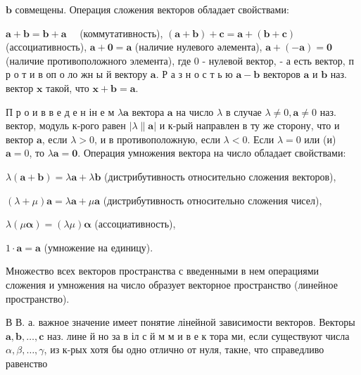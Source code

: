 \documentclass[10pt]{article}
\begin{document}
$\boldsymbol{b}$ совмещены. Операция сложения векторов обладает свойствами:



$\boldsymbol{a}+\boldsymbol{b}=\boldsymbol{b}+\boldsymbol{a} \quad$ (коммутативность), $(\boldsymbol{a}+\boldsymbol{b})+\boldsymbol{c}=\boldsymbol{a}+(\boldsymbol{b}+\boldsymbol{c})$ (ассоциативность), $\boldsymbol{a}+\mathbf{0}=\boldsymbol{a}$ (наличие нулевого әлемента), $\boldsymbol{a}+(-\boldsymbol{a})=\mathbf{0}$ (наличие противоположного элемента), где 0 - нулевой вектор, - а есть вектор, п р о т и в оп о ло жн ы й вектору $\boldsymbol{a}$. Р а з н о с т ь ю $\boldsymbol{a}-\boldsymbol{b}$ векторов $\boldsymbol{a}$ и $\boldsymbol{b}$ наз. вектор $\boldsymbol{x}$ такой, что $\boldsymbol{x}+\boldsymbol{b}=\boldsymbol{a}$.



П р о и в в е д е н ін е м $\lambda \boldsymbol{a}$ вектора $\boldsymbol{a}$ на число $\lambda$ в случае $\lambda \neq 0, \boldsymbol{a} \neq 0$ наз. вектор, модуль к-рого равен $|\lambda \| \boldsymbol{a}|$ и к-рый направлен в ту же сторону, что и вектор $\boldsymbol{a}$, если $\lambda>0$, и в противоположную, если $\lambda<0$. Если $\lambda=0$ или (и) $\boldsymbol{a}=0$, то $\lambda \boldsymbol{a}=\mathbf{0}$. Операция умножения вектора на число обладает свойствами:



$\lambda(\boldsymbol{a}+\boldsymbol{b})=\lambda \boldsymbol{a}+\lambda \boldsymbol{b}$ (дистрибутивность относительно сложения векторов),



$(\lambda+\mu) \boldsymbol{a}=\lambda \boldsymbol{a}+\mu \boldsymbol{a}$ (дистрибутивность относительно сложения чисел),



$\lambda(\mu \boldsymbol{\alpha})=(\lambda \mu) \boldsymbol{\alpha}$ (ассоциативность),



$1 \cdot \boldsymbol{a}=\boldsymbol{a}$ (умножение на единицу).



Множество всех векторов пространства с введенными в нем операциями сложения и умножения на число образует векторное пространство (линейное пространство).



В В. а. важное значение имеет понятие лінейной зависимости векторов. Векторы $\boldsymbol{a}, \boldsymbol{b}, \ldots, \boldsymbol{c}$ наз. лине й но за в іл с й м м и в е к тора ми, если существуют числа $\alpha, \beta, \ldots, \gamma$, из к-рых хотя бы одно отлично от нуля, такне, что справедливо равенство
\end{document}
